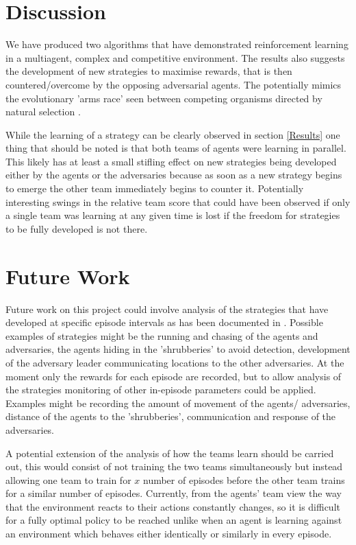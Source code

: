 \documentclass{article}
\begin{document}
\section{Discussion} \label{Discussion}

We have produced two algorithms that have demonstrated reinforcement learning in a multiagent, complex and competitive environment.
The results also suggests the development of new strategies to maximise rewards, that is then countered/overcome by the opposing adversarial agents.
The potentially mimics the evolutionary 'arms race' seen between competing organisms directed by natural selection \citet{armsrace}.

While the learning of a strategy can be clearly observed in section \ref{Results} one thing that should be noted is that both teams of agents were learning in parallel.
This likely has at least a small stifling effect on new strategies being developed either by the agents or the adversaries because as soon as a new strategy begins to emerge the other team immediately begins to counter it.
Potentially interesting swings in the relative team score that could have been observed if only a single team was learning at any given time is lost if the freedom for strategies to be fully developed is not there.

\section{Future Work} \label{Future Work}

Future work on this project could involve analysis of the strategies that have developed at specific episode intervals as has been documented in \citet{emergenttoolusage}.
Possible examples of strategies might be the running and chasing of the agents and adversaries, the agents hiding in the 'shrubberies' to avoid detection, development of the adversary leader communicating locations to the other adversaries.
At the moment only the rewards for each episode are recorded, but to allow analysis of the strategies monitoring of other in-episode parameters could be applied.
Examples might be recording the amount of movement of the agents/ adversaries, distance of the agents to the 'shrubberies', communication and response of the adversaries.

A potential extension of the analysis of how the teams learn should be carried out, this would consist of not training the two teams simultaneously but instead allowing one team to train for $x$ number of episodes before the other team trains for a similar number of episodes.
Currently, from the agents' team view the way that the environment reacts to their actions constantly changes, so it is difficult for a fully optimal policy to be reached unlike when an agent is learning against an environment which behaves either identically or similarly in every episode.
\end{document}

